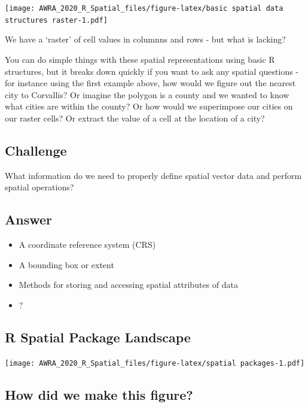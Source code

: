 \documentclass[
]{book}
\providecommand{\tightlist}{%
  \setlength{\itemsep}{0pt}\setlength{\parskip}{0pt}}
\begin{document}
\texttt{[image: AWRA\_2020\_R\_Spatial\_files/figure-latex/basic spatial data structures raster-1.pdf]}

We have a `raster' of cell values in columnns and rows - but what is lacking?

You can do simple things with these spatial representations using basic R structures, but it breaks down quickly if you want to ask any spatial questions - for instance using the first example above, how would we figure out the nearest city to Corvallis? Or imagine the polygon is a county and we wanted to know what cities are within the county? Or how would we superimpose our cities on our raster cells? Or extract the value of a cell at the location of a city?

\hypertarget{challenge}{%
\subsection{Challenge}\label{challenge}}

What information do we need to properly define spatial vector data and perform spatial operations?

\hypertarget{answer}{%
\subsection{Answer}\label{answer}}

\begin{itemize}
\tightlist
\item
  A coordinate reference system (CRS)
\item
  A bounding box or extent
\item
  Methods for storing and accessing spatial attributes of data
\item
  ?
\end{itemize}

\hypertarget{r-spatial-package-landscape}{%
\subsection{R Spatial Package Landscape}\label{r-spatial-package-landscape}}

\texttt{[image: AWRA\_2020\_R\_Spatial\_files/figure-latex/spatial packages-1.pdf]}

\hypertarget{how-did-we-make-this-figure}{%
\subsection{How did we make this figure?}\label{how-did-we-make-this-figure}}
\end{document}
